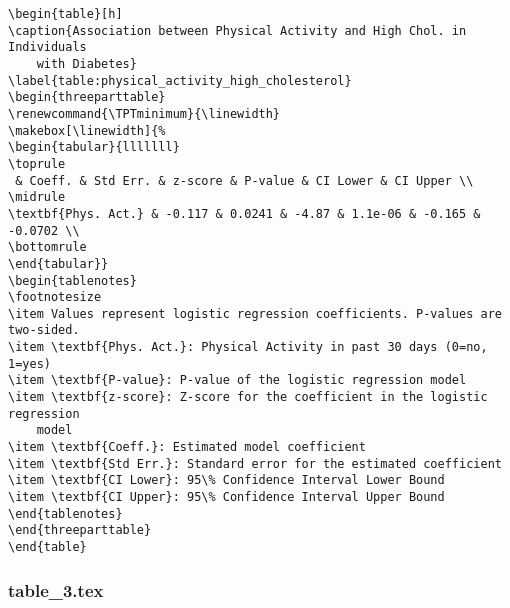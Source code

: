 \documentclass[11pt]{article}
\begin{document}
\begin{Verbatim}[tabsize=4]
\begin{table}[h]
\caption{Association between Physical Activity and High Chol. in Individuals
	with Diabetes}
\label{table:physical_activity_high_cholesterol}
\begin{threeparttable}
\renewcommand{\TPTminimum}{\linewidth}
\makebox[\linewidth]{%
\begin{tabular}{lllllll}
\toprule
 & Coeff. & Std Err. & z-score & P-value & CI Lower & CI Upper \\
\midrule
\textbf{Phys. Act.} & -0.117 & 0.0241 & -4.87 & 1.1e-06 & -0.165 & -0.0702 \\
\bottomrule
\end{tabular}}
\begin{tablenotes}
\footnotesize
\item Values represent logistic regression coefficients. P-values are two-sided.
\item \textbf{Phys. Act.}: Physical Activity in past 30 days (0=no, 1=yes)
\item \textbf{P-value}: P-value of the logistic regression model
\item \textbf{z-score}: Z-score for the coefficient in the logistic regression
	model
\item \textbf{Coeff.}: Estimated model coefficient
\item \textbf{Std Err.}: Standard error for the estimated coefficient
\item \textbf{CI Lower}: 95\% Confidence Interval Lower Bound
\item \textbf{CI Upper}: 95\% Confidence Interval Upper Bound
\end{tablenotes}
\end{threeparttable}
\end{table}

\end{Verbatim}

\subsubsection*{table\_3.tex}
\end{document}
